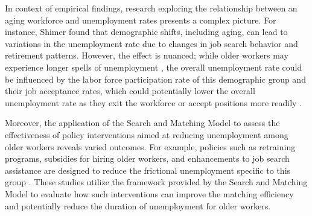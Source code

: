 \documentclass[ %
    final,
    scrbook,
    listoffigures,
    listoftables, 
    glossary]{cu-thesis}
\begin{document}
In context of empirical findings, research exploring the relationship between an aging workforce and unemployment rates presents a complex picture. For instance, Shimer \cite{shimer2005cyclical} found that demographic shifts, including aging, can lead to variations in the unemployment rate due to changes in job search behavior and retirement patterns. However, the effect is nuanced; while older workers may experience longer spells of unemployment \cite{kroft2016long}, the overall unemployment rate could be influenced by the labor force participation rate of this demographic group and their job acceptance rates, which could potentially lower the overall unemployment rate as they exit the workforce or accept positions more readily \cite{fallick2006job}.

Moreover, the application of the Search and Matching Model to assess the effectiveness of policy interventions aimed at reducing unemployment among older workers reveals varied outcomes. For example, policies such as retraining programs, subsidies for hiring older workers, and enhancements to job search assistance are designed to reduce the frictional unemployment specific to this group \cite{lalive2008impact}. These studies utilize the framework provided by the Search and Matching Model to evaluate how such interventions can improve the matching efficiency and potentially reduce the duration of unemployment for older workers.


\iffalse
\chapter{}
\end{document}
